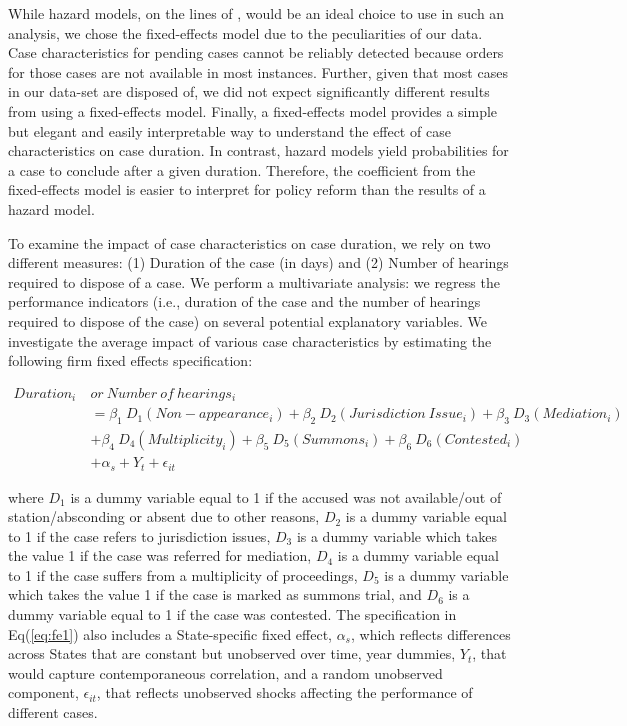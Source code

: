 \documentclass[12pt,a4paper]{article}
\begin{document}
While hazard models, on the lines of \textcite{datta2017_itatDelays}, would be an ideal choice to use in such an analysis, we chose the fixed-effects model due to the peculiarities of our data. Case characteristics for pending cases cannot be reliably detected because orders for those cases are not available in most instances. Further, given that most cases in our data-set are disposed of, we did not expect significantly different results from using a fixed-effects model. Finally, a fixed-effects model provides a simple but elegant and easily interpretable way to understand the effect of case characteristics on case duration. In contrast, hazard models yield probabilities for a case to conclude after a given duration. Therefore, the coefficient from the fixed-effects model is easier to interpret for policy reform than the results of a hazard model.

To examine the impact of case characteristics on case duration, we rely on two different measures: (1) Duration of the case (in days) and (2) Number of hearings required to dispose of a case. We perform a multivariate analysis: we regress the performance indicators (i.e., duration of the case and the number of hearings required to dispose of the case) on several potential explanatory variables. We investigate the average impact of various case characteristics by estimating
the following firm fixed effects specification:

\begin{equation}\label{eq:fe1}
\begin{split}
Duration_i \ & or \ Number \ of \ hearings_i \\
& = \beta_1 \ D_1(Non-appearance_i) + \beta_2 \ D_2(Jurisdiction \ Issue_i) + \beta_3 \ D_3(Mediation_i) \\
& + \beta_4 \ D_4(Multiplicity_i) + \beta_5 \ D_5(Summons_i) + \beta_6 \ D_6(Contested_i) \\
& + \alpha_s + Y_t + \epsilon_{it}
\end{split}
\end{equation}

where $D_1$ is a dummy variable equal to 1 if the accused was not available/out of station/absconding or absent due to other reasons, $D_2$ is a dummy variable equal to 1 if the case refers to jurisdiction issues, $D_3$ is a dummy variable which takes the value 1 if the case was referred for mediation, $D_4$ is a dummy variable equal to 1 if the case suffers from a multiplicity of proceedings, $D_5$ is a dummy variable which takes the value 1 if the case is marked as summons trial, and $D_6$ is a dummy variable equal to 1 if the case was contested. The specification in Eq(\ref{eq:fe1}) also includes a State-specific fixed effect, $\alpha_s$, which reflects differences across States that are constant but unobserved over time, year dummies, $Y_t$, that would capture contemporaneous correlation, and a random unobserved component, $\epsilon_{it}$, that reflects unobserved shocks affecting the performance of different cases.
\end{document}
